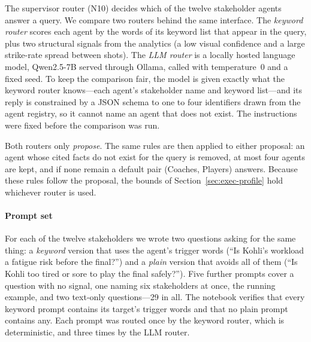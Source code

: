\begin{table}[t]
  \centering
  \footnotesize
  \caption{Two queries traced through the graph. A: \emph{``Compare Kohli's
    cover drive vs his pull shot against fast bowlers in the powerplay''}.
    B: \emph{``Is Kohli's workload a fatigue risk before the final?''}. Each
    cell is what the stage wrote to the shared state; agent cells list every
    figure the agent cites.}
  \label{tab:prompt-flow}
  
\end{table}

The supervisor router (N10) decides which of the twelve stakeholder agents
answer a query. We compare two routers behind the same interface. The
\emph{keyword router} scores each agent by the words of its keyword list that
appear in the query, plus two structural signals from the analytics (a low
visual confidence and a large strike-rate spread between shots). The
\emph{LLM router} is a locally hosted language model, Qwen2.5-7B served through
Ollama, called with temperature~0 and a fixed seed. To keep the comparison fair,
the model is given exactly what the keyword router knows---each agent's
stakeholder name and keyword list---and its reply is constrained by a JSON
schema to one to four identifiers drawn from the agent registry, so it cannot
name an agent that does not exist. The instructions were fixed before the
comparison was run.

Both routers only \emph{propose}. The same rules are then applied to either
proposal: an agent whose cited facts do not exist for the query is removed, at
most four agents are kept, and if none remain a default pair (Coaches, Players)
answers. Because these rules follow the proposal, the bounds of
Section~\ref{sec:exec-profile} hold whichever router is used.

\paragraph{Prompt set}
For each of the twelve stakeholders we wrote two questions asking for the same
thing: a \emph{keyword} version that uses the agent's trigger words (``Is Kohli's
workload a fatigue risk before the final?'') and a \emph{plain} version that
avoids all of them (``Is Kohli too tired or sore to play the final safely?'').
Five further prompts cover a question with no signal, one naming six
stakeholders at once, the running example, and two text-only questions---29 in
all. The notebook verifies that every keyword prompt contains its target's
trigger words and that no plain prompt contains any. Each prompt was routed
once by the keyword router, which is deterministic, and three times by the LLM
router.

